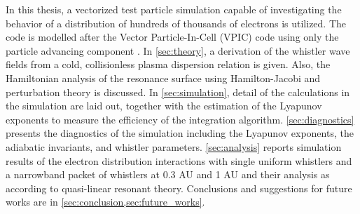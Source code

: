 In this thesis, a vectorized test particle simulation capable of
investigating the behavior of a distribution of hundreds of thousands of
electrons is utilized. The code is modelled after the Vector Particle-In-Cell 
(VPIC) code using only the particle advancing component \citep{Bowers2008}. In
\cref{sec:theory}, a derivation of the whistler wave fields from a cold, 
collisionless plasma dispersion relation is given. Also, the Hamiltonian
analysis of the resonance surface using Hamilton-Jacobi and perturbation theory
is discussed. In \cref{sec:simulation}, detail of the calculations in the
simulation are laid out, together with the estimation of the Lyapunov exponents 
to measure the efficiency of the integration algorithm.
\cref{sec:diagnostics} presents the diagnostics of the simulation including the 
Lyapunov exponents, the adiabatic invariants, and whistler parameters. 
\cref{sec:analysis} reports simulation results of the electron distribution 
interactions with single uniform whistlers and a narrowband packet of whistlers 
at 0.3 AU and 1 AU and their analysis as according to quasi-linear
resonant theory. Conclusions and suggestions for future works are in
\cref{sec:conclusion,sec:future_works}.
